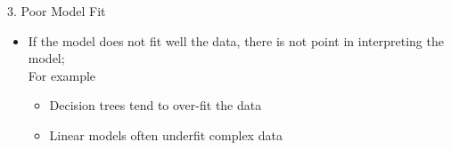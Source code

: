 \documentclass[aspectratio=169]{../latex_main/tntbeamer}  %
\begin{document}
    \begin{frame}[c]{3. Poor Model Fit}
    
        \begin{itemize}
            \item If the model does not fit well the data, there is not point in interpreting the model;\\
            For example
            \begin{itemize}
                \item Decision trees tend to over-fit the data
                \item Linear models often underfit complex data
            \end{itemize}
        \end{itemize}
    
    \end{frame}

	
\end{document}
